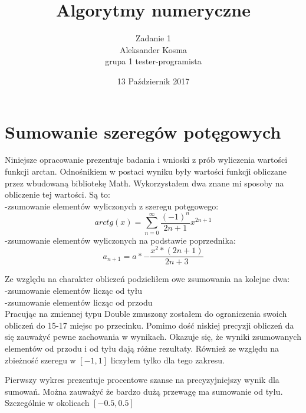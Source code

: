\documentclass[10pt]{article}
\title{Algorytmy numeryczne}
\author{Zadanie 1 \\ Aleksander Kosma\\grupa 1 tester-programista}
\date{13 Październik 2017}
\begin{document}
\maketitle 

\section{Sumowanie szeregów potęgowych}



Niniejsze opracowanie prezentuje badania i wnioski z prób wyliczenia wartości funkcji arctan.
Odnośnikiem w postaci wyniku były wartości funkcji obliczane przez wbudowaną bibliotekę Math.
Wykorzystałem dwa znane mi sposoby na obliczenie tej wartości. Są to:\\
-zsumowanie elementów wyliczonych z szeregu potęgowego:\\
$$arctg(x) = \sum_{n=0}^{\infty}\frac{(-1)^n}{2n + 1} x^{2n + 1}$$
-zsumowanie elementów wyliczonych na podstawie poprzednika:\\
$$a_{n+1}= a *-\frac{x^2 * (2n + 1)}{2n + 3}$$

Ze względu na charakter obliczeń podzieliłem owe zsumowania na kolejne dwa:\\
-zsumowanie elementów licząc od tyłu\\
-zsumowanie elementów licząc od przodu\\

Pracując na zmiennej typu Double zmuszony zostałem do ograniczenia swoich obliczeń do 15-17 miejsc po przecinku.
Pomimo dość niskiej precyzji obliczeń da się zauważyć pewne zachowania w wynikach. Okazuje się, że wyniki
zsumowanych elementów od przodu i od tyłu dają różne rezultaty. Również ze względu na zbieżność szeregu w $[-1,1]$ 
liczyłem tylko dla tego zakresu.

Pierwszy wykres prezentuje procentowe szanse na precyzyjniejszy wynik dla sumowań.
Można zauważyć że bardzo dużą przewagę ma sumowanie od tyłu. Szczególnie w okolicach $[-0.5,0.5]$

\begin{center}
\end{center}
\end{document}
